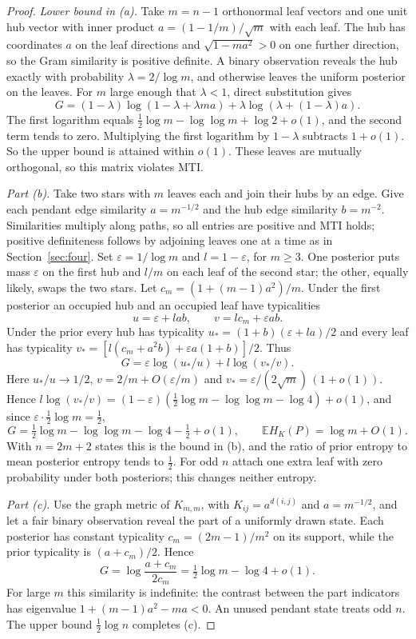 \documentclass[11pt,a4paper]{article}
\theoremstyle{remark}
\begin{document}
\begin{proof}
\emph{Lower bound in (a).} Take $m=n-1$ orthonormal leaf vectors and one unit hub vector with inner product $a=(1-1/m)/\sqrt m$ with each leaf. The hub has coordinates $a$ on the leaf directions and $\sqrt{1-ma^2}>0$ on one further direction, so the Gram similarity is positive definite. A binary observation reveals the hub exactly with probability $\lambda=2/\log m$, and otherwise leaves the uniform posterior on the leaves. For $m$ large enough that $\lambda<1$, direct substitution gives
\[
 G=(1-\lambda)\log(1-\lambda+\lambda m a)
      +\lambda\log(\lambda+(1-\lambda)a).
\]
The first logarithm equals $\tfrac12\log m-\log\log m+\log2+o(1)$, and the second term tends to zero. Multiplying the first logarithm by $1-\lambda$ subtracts $1+o(1)$. So the upper bound is attained within $o(1)$. These leaves are mutually orthogonal, so this matrix violates MTI.

\emph{Part (b).} Take two stars with $m$ leaves each and join their hubs by an edge. Give each pendant edge similarity $a=m^{-1/2}$ and the hub edge similarity $b=m^{-2}$. Similarities multiply along paths, so all entries are positive and MTI holds; positive definiteness follows by adjoining leaves one at a time as in Section~\ref{sec:four}. Set $\varepsilon=1/\log m$ and $l=1-\varepsilon$, for $m\ge3$. One posterior puts mass $\varepsilon$ on the first hub and $l/m$ on each leaf of the second star; the other, equally likely, swaps the two stars. Let $c_m=(1+(m-1)a^2)/m$. Under the first posterior an occupied hub and an occupied leaf have typicalities
\[
 u=\varepsilon+l ab,\qquad v=l c_m+\varepsilon ab.
\]
Under the prior every hub has typicality $u_*=(1+b)(\varepsilon+l a)/2$ and every leaf has typicality $v_*=[l(c_m+a^2 b)+\varepsilon a(1+b)]/2$. Thus
\[
 G=\varepsilon\log(u_*/u)+l\log(v_*/v).
\]
Here $u_*/u\to1/2$, $v=2/m+O(\varepsilon/m)$ and $v_*=\varepsilon/(2\sqrt m)\,(1+o(1))$. Hence $l\log(v_*/v)=(1-\varepsilon)(\tfrac12\log m-\log\log m-\log4)+o(1)$, and since $\varepsilon\cdot\tfrac12\log m=\tfrac12$,
\[
 G=\tfrac12\log m-\log\log m-\log4-\tfrac12+o(1),\qquad
 \mathbb E H_K(P)=\log m+O(1).
\]
With $n=2m+2$ states this is the bound in (b), and the ratio of prior entropy to mean posterior entropy tends to $\tfrac12$. For odd $n$ attach one extra leaf with zero probability under both posteriors; this changes neither entropy.

\emph{Part (c).} Use the graph metric of $K_{m,m}$, with $K_{ij}=a^{d(i,j)}$ and $a=m^{-1/2}$, and let a fair binary observation reveal the part of a uniformly drawn state. Each posterior has constant typicality $c_m=(2m-1)/m^2$ on its support, while the prior typicality is $(a+c_m)/2$. Hence
\[
 G=\log\frac{a+c_m}{2c_m}=\tfrac12\log m-\log 4+o(1).
\]
For large $m$ this similarity is indefinite: the contrast between the part indicators has eigenvalue $1+(m-1)a^2-ma<0$. An unused pendant state treats odd $n$. The upper bound $\tfrac12\log n$ completes (c).
\end{proof}
\end{document}
